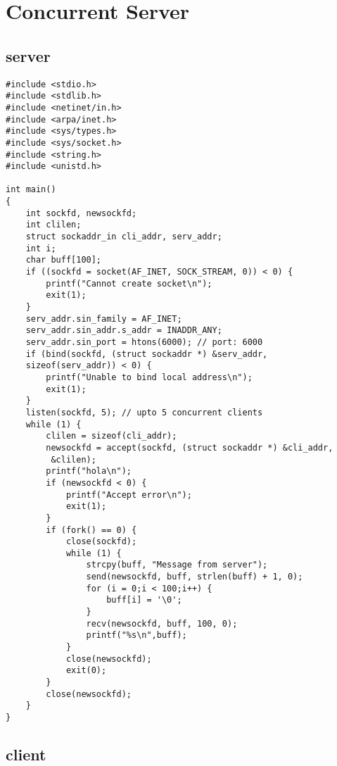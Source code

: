 \documentclass[12pt]{article}
\begin{document}


\section{Concurrent Server}
\subsection{server}

\begin{lstlisting}
#include <stdio.h>
#include <stdlib.h>
#include <netinet/in.h>
#include <arpa/inet.h>
#include <sys/types.h>
#include <sys/socket.h>
#include <string.h>
#include <unistd.h>

int main()
{
	int sockfd, newsockfd;
	int clilen;
	struct sockaddr_in cli_addr, serv_addr;
	int i;
	char buff[100];
	if ((sockfd = socket(AF_INET, SOCK_STREAM, 0)) < 0) {
		printf("Cannot create socket\n");
		exit(1);
	}
	serv_addr.sin_family = AF_INET;
	serv_addr.sin_addr.s_addr = INADDR_ANY;
	serv_addr.sin_port = htons(6000); // port: 6000
	if (bind(sockfd, (struct sockaddr *) &serv_addr, 
	sizeof(serv_addr)) < 0) {
		printf("Unable to bind local address\n");
		exit(1);
	}
	listen(sockfd, 5); // upto 5 concurrent clients
	while (1) {
		clilen = sizeof(cli_addr);
		newsockfd = accept(sockfd, (struct sockaddr *) &cli_addr,
		 &clilen);
		printf("hola\n");
		if (newsockfd < 0) {
			printf("Accept error\n");
			exit(1);
		}
		if (fork() == 0) {
			close(sockfd);
			while (1) {
				strcpy(buff, "Message from server");
				send(newsockfd, buff, strlen(buff) + 1, 0);
				for (i = 0;i < 100;i++) {
					buff[i] = '\0';
				}
				recv(newsockfd, buff, 100, 0);
				printf("%s\n",buff);
			}
			close(newsockfd);
			exit(0);
		}
		close(newsockfd);
	}
}
\end{lstlisting}

\subsection{client}
\end{document}
